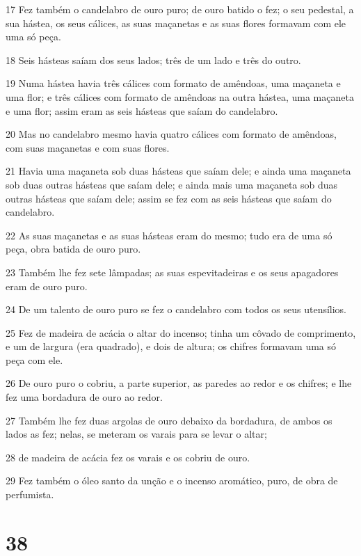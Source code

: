 \par 17 Fez também o candelabro de ouro puro; de ouro batido o fez; o seu pedestal, a sua hástea, os seus cálices, as suas maçanetas e as suas flores formavam com ele uma só peça.
\par 18 Seis hásteas saíam dos seus lados; três de um lado e três do outro.
\par 19 Numa hástea havia três cálices com formato de amêndoas, uma maçaneta e uma flor; e três cálices com formato de amêndoas na outra hástea, uma maçaneta e uma flor; assim eram as seis hásteas que saíam do candelabro.
\par 20 Mas no candelabro mesmo havia quatro cálices com formato de amêndoas, com suas maçanetas e com suas flores.
\par 21 Havia uma maçaneta sob duas hásteas que saíam dele; e ainda uma maçaneta sob duas outras hásteas que saíam dele; e ainda mais uma maçaneta sob duas outras hásteas que saíam dele; assim se fez com as seis hásteas que saíam do candelabro.
\par 22 As suas maçanetas e as suas hásteas eram do mesmo; tudo era de uma só peça, obra batida de ouro puro.
\par 23 Também lhe fez sete lâmpadas; as suas espevitadeiras e os seus apagadores eram de ouro puro.
\par 24 De um talento de ouro puro se fez o candelabro com todos os seus utensílios.
\par 25 Fez de madeira de acácia o altar do incenso; tinha um côvado de comprimento, e um de largura (era quadrado), e dois de altura; os chifres formavam uma só peça com ele.
\par 26 De ouro puro o cobriu, a parte superior, as paredes ao redor e os chifres; e lhe fez uma bordadura de ouro ao redor.
\par 27 Também lhe fez duas argolas de ouro debaixo da bordadura, de ambos os lados as fez; nelas, se meteram os varais para se levar o altar;
\par 28 de madeira de acácia fez os varais e os cobriu de ouro.
\par 29 Fez também o óleo santo da unção e o incenso aromático, puro, de obra de perfumista.

\chapter{38}

